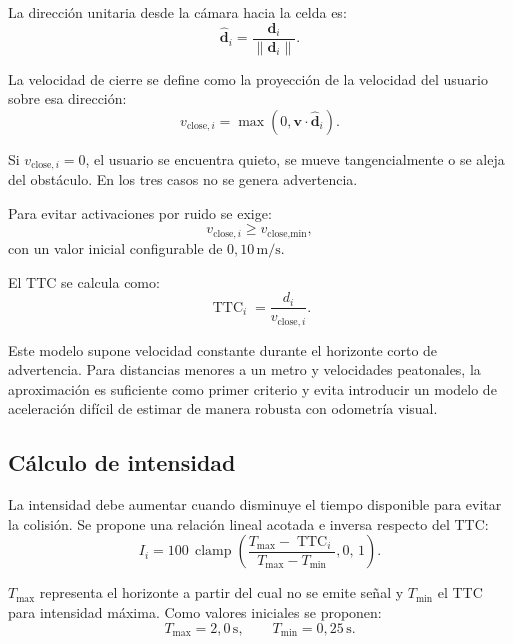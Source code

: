 La dirección unitaria desde la cámara hacia la celda es:
%
\begin{equation}
  \label{eq:sa-direction}
  \mathbf{\hat d}_i =
  \frac{\mathbf{d}_i}{\|\mathbf{d}_i\|}.
\end{equation}

La velocidad de cierre se define como la proyección de la velocidad del
usuario sobre esa dirección:
%
\begin{equation}
  \label{eq:sa-closing-speed}
  v_{\text{close},i}
  =
  \max\left(0,\mathbf{v}\cdot\mathbf{\hat d}_i\right).
\end{equation}

Si $v_{\text{close},i}=0$, el usuario se encuentra quieto, se mueve
tangencialmente o se aleja del obstáculo. En los tres casos no se genera
advertencia.

Para evitar activaciones por ruido se exige:
%
\begin{equation}
  \label{eq:sa-closing-threshold}
  v_{\text{close},i} \geq v_{\text{close,min}},
\end{equation}
%
con un valor inicial configurable de $0{,}10\,\text{m/s}$.

El TTC se calcula como:
%
\begin{equation}
  \label{eq:sa-ttc}
  \operatorname{TTC}_i =
  \frac{d_i}{v_{\text{close},i}}.
\end{equation}

Este modelo supone velocidad constante durante el horizonte corto de
advertencia. Para distancias menores a un metro y velocidades peatonales, la
aproximación es suficiente como primer criterio y evita introducir un modelo
de aceleración difícil de estimar de manera robusta con odometría visual.

\subsection{Cálculo de intensidad}
\label{subsec:sa-intensity}

La intensidad debe aumentar cuando disminuye el tiempo disponible para evitar
la colisión. Se propone una relación lineal acotada e inversa respecto del TTC:
%
\begin{equation}
  \label{eq:sa-intensity}
  I_i =
  100\,
  \operatorname{clamp}
  \left(
    \frac{T_{\max}-\operatorname{TTC}_i}
         {T_{\max}-T_{\min}},
    0,\,
    1
  \right).
\end{equation}

$T_{\max}$ representa el horizonte a partir del cual no se emite señal y
$T_{\min}$ el TTC para intensidad máxima. Como valores iniciales se proponen:
%
\begin{equation}
  T_{\max}=2{,}0\,\text{s},
  \qquad
  T_{\min}=0{,}25\,\text{s}.
\end{equation}

